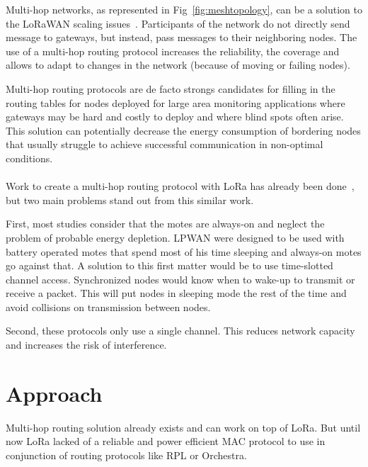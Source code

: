 

Multi-hop networks, as represented in Fig~\ref{fig:meshtopology}, can be a solution to
the LoRaWAN scaling issues~\cite{8115756}.
Participants of the network do not directly send message to gateways, but
instead, pass messages to their neighboring nodes.
The use of a multi-hop routing protocol increases the reliability, the coverage
and allows to adapt to changes in the network (because of moving or failing nodes).

Multi-hop routing protocols are de facto strongs candidates for filling in the
routing tables for nodes deployed for large area monitoring 
applications where gateways may be hard and costly to deploy and where blind
spots often arise.
This solution can potentially decrease the energy consumption of bordering 
nodes that usually struggle to achieve successful communication in non-optimal
conditions.

\paragraph{}

Work to create a multi-hop routing protocol with LoRa has already been
done~\cite{8115756, DIAS2018424, 8856256, Abrardo_2019, duong2018}, 
but two main problems stand out from this similar work.

First, most studies consider that the motes are always-on and
neglect the problem of probable energy depletion. 
LPWAN were designed to be used with battery operated motes that spend most of
his time sleeping and always-on motes go against that.
A solution to this first matter would be to use time-slotted channel access.
Synchronized nodes would know when to wake-up to transmit or receive a packet.
This will put nodes in sleeping mode the rest of the time and avoid collisions
on transmission between nodes.

Second, these protocols only use a single channel. 
This reduces network capacity and increases the risk of 
interference.

\section{Approach}

Multi-hop routing solution already exists and can work on top of LoRa.
But until now LoRa lacked of a reliable and power efficient MAC protocol 
to use in conjunction of routing protocols like RPL or Orchestra.


